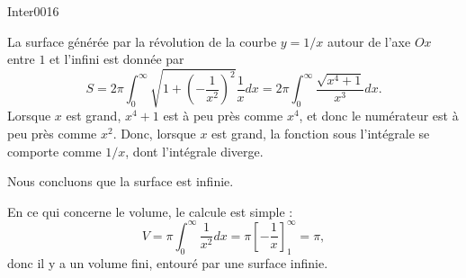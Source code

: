 \begin{corrige}{Inter0016}

La surface générée par la révolution de la courbe $y=1/x$ autour de l'axe $Ox$ entre $1$ et l'infini est donnée par
\begin{equation}
	S=2\pi\int_0^{\infty}\sqrt{1+\left( -\frac{1}{ x^2 } \right)^2}\frac{1}{ x }dx=2\pi\int_0^{\infty}\frac{ \sqrt{x^4+1} }{ x^3 }dx.
\end{equation}
Lorsque $x$ est grand, $x^4+1$ est à peu près comme $x^4$, et donc le numérateur est à peu près comme $x^2$. Donc, lorsque $x$ est grand, la fonction sous l'intégrale se comporte comme $1/x$, dont l'intégrale diverge.

Nous concluons que la surface est infinie.

En ce qui concerne le volume, le calcule est simple :
\begin{equation}
	V=\pi\int_0^{\infty}\frac{1}{ x^2 }dx=\pi\left[ -\frac{1}{ x } \right]_1^{\infty}=\pi,
\end{equation}
donc il y a un volume fini, entouré par une surface infinie.

\end{corrige}
